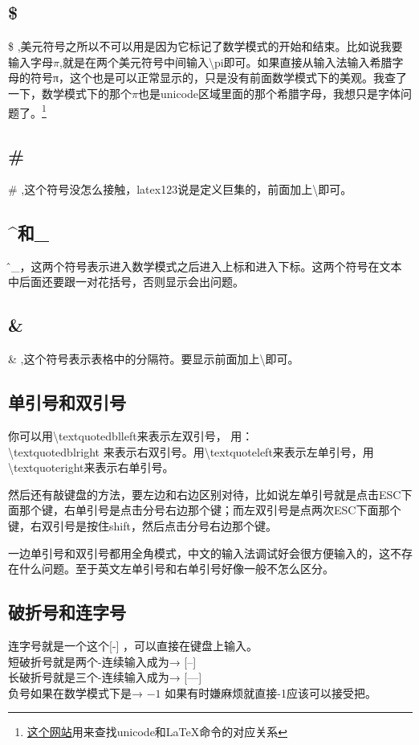 \documentclass[11pt,oneside]{book}
\begin{document}
\subsection{\$}
\$ ,美元符号之所以不可以用是因为它标记了数学模式的开始和结束。比如说我要输入字母$\pi$,就是在两个美元符号中间输入\textbackslash pi即可。如果直接从输入法输入希腊字母的符号π，这个也是可以正常显示的，只是没有前面数学模式下的美观。我查了一下，数学模式下的那个$\pi$也是unicode区域里面的那个希腊字母，我想只是字体问题了。\footnote{\href{http://www.johndcook.com/unicode_latex.html}{这个网站}用来查找unicode和\LaTeX 命令的对应关系}

\subsection{\#}
\# ,这个符号没怎么接触，latex123说是定义巨集的，前面加上\textbackslash 即可。

\subsection{\^{}和\_{}}
\^和\_{}，这两个符号表示进入数学模式之后进入上标和进入下标。这两个符号在文本中后面还要跟一对花括号，否则显示会出问题。

\subsection{\&}
\& ,这个符号表示表格中的分隔符。要显示前面加上\textbackslash 即可。

\subsection{单引号和双引号}
你可以用\textbackslash textquotedblleft来表示左双引号， 用：\\
\textbackslash textquotedblright 来表示右双引号。用\textbackslash textquoteleft来表示左单引号，用\textbackslash textquoteright来表示右单引号。

然后还有敲键盘的方法，要左边和右边区别对待，比如说左单引号就是点击ESC下面那个键，右单引号是点击分号右边那个键；而左双引号是点两次ESC下面那个键，右双引号是按住shift，然后点击分号右边那个键。

一边单引号和双引号都用全角模式，中文的输入法调试好会很方便输入的，这不存在什么问题。至于英文左单引号和右单引号好像一般不怎么区分。

\subsection{破折号和连字号}
连字号就是一个这个[-] ，可以直接在键盘上输入。\\
短破折号就是两个-连续输入成为→  [--]\\
长破折号就是三个-连续输入成为→  [---]\\
负号如果在数学模式下是→  $ -1 $  如果有时嫌麻烦就直接-1应该可以接受把。
\end{document}
